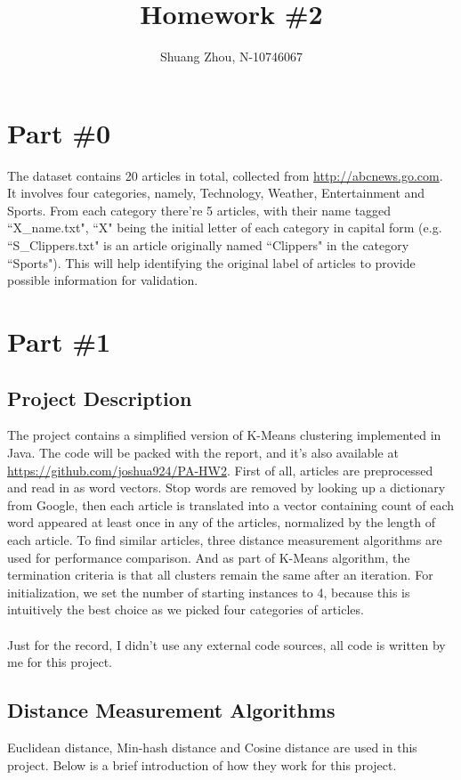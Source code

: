 \documentclass[12pt]{article}
\title{Homework \#2}
\author{Shuang Zhou, N-10746067}
\begin{document}
\maketitle
\section*{Part \#0}
The dataset contains 20 articles in total, collected from \textcolor{blue}{\url{http://abcnews.go.com}}. It involves four categories, namely, Technology, Weather, Entertainment and Sports. From each category there're 5 articles, with their name tagged ``X\_name.txt", ``X" being the initial letter of each category in capital form (e.g. ``S\_Clippers.txt" is an article originally named ``Clippers" in the category ``Sports"). This will help identifying the original label of articles to provide possible information for validation.
\section*{Part \#1}
\subsection*{Project Description}
The project contains a simplified version of K-Means clustering implemented in Java. The code will be packed with the report, and it's also available at \textcolor{blue}{\url{https://github.com/joshua924/PA-HW2}}. First of all, articles are preprocessed and read in as word vectors. Stop words are removed by looking up a dictionary from Google, then each article is translated into a vector containing count of each word appeared at least once in any of the articles, normalized by the length of each article. To find similar articles, three distance measurement algorithms are used for performance comparison. And as part of K-Means algorithm, the termination criteria is that all clusters remain the same after an iteration. For initialization, we set the number of starting instances to 4, because this is intuitively the best choice as we picked four categories of articles.\\
\\
Just for the record, I didn't use any external code sources, all code is written by me for this project.
\subsection*{Distance Measurement Algorithms}
Euclidean distance, Min-hash distance and Cosine distance are used in this project. Below is a brief introduction of how they work for this project.\\
\end{document}
